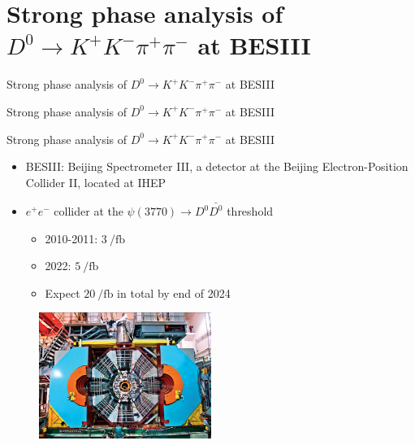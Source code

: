 \documentclass{beamer}
\begin{document}
\section{Strong phase analysis of \texorpdfstring{$D^0\to K^+K^-\pi^+\pi^-$}{D2KKpipi} at BESIII}
\begin{frame}{Strong phase analysis of $D^0\to K^+K^-\pi^+\pi^-$ at BESIII}
  \begin{center}
    {\huge Strong phase analysis of $D^0\to K^+K^-\pi^+\pi^-$ at BESIII}
  \end{center}
\end{frame}

\begin{frame}{Strong phase analysis of $D^0\to K^+K^-\pi^+\pi^-$ at BESIII}
  \begin{itemize}
    \item{BESIII: Beijing Spectrometer III, a detector at the Beijing Electron-Position Collider II, located at IHEP}
    \item{$e^+e^-$ collider at the $\psi(3770)\to D^0\bar{D^0}$ threshold}
    \begin{itemize}
      \item{2010-2011: $\SI{3}{\per\femto\barn}$}
      \item{2022: $\SI{5}{\per\femto\barn}$}
      \item{Expect $\SI{20}{\per\femto\barn}$ in total by end of 2024}
    \end{itemize}
  \end{itemize}
  \begin{figure}
    \includegraphics[width = 0.50\textwidth]{Plots/BESIIIDetector.jpg}
  \end{figure}
\end{frame}
\end{document}
